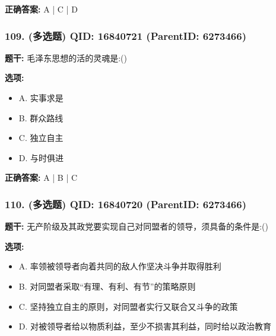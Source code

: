 \documentclass[12pt,UTF8]{ctexart}
\begin{document}
\textbf{正确答案:}
A | C | D

\vspace{0.3em}\hrulefill\vspace{0.7em}

\subsubsection*{109. (多选题) \small QID: 16840721 (ParentID: 6273466)}

\textbf{题干:}
毛泽东思想的活的灵魂是:()



\textbf{选项:}
\begin{itemize}[leftmargin=*]

  \item A. 实事求是

  \item B. 群众路线

  \item C. 独立自主

  \item D. 与时俱进

\end{itemize}

\textbf{正确答案:}
A | B | C

\vspace{0.3em}\hrulefill\vspace{0.7em}

\subsubsection*{110. (多选题) \small QID: 16840720 (ParentID: 6273466)}

\textbf{题干:}
无产阶级及其政党要实现自己对同盟者的领导，须具备的条件是:()



\textbf{选项:}
\begin{itemize}[leftmargin=*]

  \item A. 率领被领导者向着共同的敌人作坚决斗争并取得胜利

  \item B. 对同盟者采取“有理、有利、有节”的策略原则

  \item C. 坚持独立自主的原则，对同盟者实行又联合又斗争的政策

  \item D. 对被领导者给以物质利益，至少不损害其利益，同时给以政治教育

\end{itemize}
\end{document}
